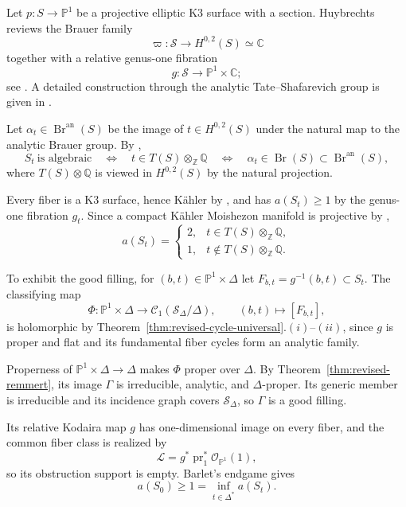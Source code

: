 \documentclass[11pt]{amsart}
\numberwithin{equation}{section}
\theoremstyle{plain}
\theoremstyle{definition}
\newcommand{\C}{\mathbb C}
\newcommand{\Z}{\mathbb Z}
\newcommand{\Q}{\mathbb Q}
\newcommand{\cC}{\mathcal C}
\newcommand{\cO}{\mathcal O}
\begin{document}
Let $p:S\to\mathbb P^1$ be a projective elliptic K3 surface with a section.
Huybrechts reviews the Brauer family
\begin{equation*}
 \varpi:\mathscr S\longrightarrow H^{0,2}(S)\simeq\C
\end{equation*}
together with a relative genus-one fibration
\begin{equation*}
 g:\mathscr S\longrightarrow\mathbb P^1\times\C;
\end{equation*}
see \cite[\S~1.2, equation~(1.1), and Remark~1.7]{Hu23}.  A detailed
construction through the analytic Tate--Shafarevich group is given in
\cite[Chapter~1.5]{FM94}.

Let $\alpha_t\in\operatorname{Br}^{\mathrm{an}}(S)$ be the image of
$t\in H^{0,2}(S)$ under the natural map to the analytic Brauer group.
By \cite[Corollary~3.3]{Hu23},
\[
 S_t\ \text{is algebraic}
 \quad\Longleftrightarrow\quad
 t\in T(S)\otimes_{\Z}\Q
 \quad\Longleftrightarrow\quad
 \alpha_t\in\operatorname{Br}(S)
 \subset\operatorname{Br}^{\mathrm{an}}(S),
\]
where $T(S)\otimes\Q$ is viewed in $H^{0,2}(S)$ by the natural projection.

Every fiber is a K3 surface, hence K\"ahler by \cite[Main Theorem]{Si83}, and has
$a(S_t)\ge1$ by the genus-one fibration $g_t$.  Since a compact K\"ahler
Moishezon manifold is projective by \cite{Mo67},
\begin{equation*}
 a(S_t)=
 \begin{cases}
 2,&t\in T(S)\otimes_{\Z}\Q,\\
 1,&t\notin T(S)\otimes_{\Z}\Q.
 \end{cases}
\end{equation*}

To exhibit the good filling, for $(b,t)\in\mathbb P^1\times\Delta$ let
$F_{b,t}=g^{-1}(b,t)\subset S_t$.  The classifying map
\[
 \Phi:\mathbb P^1\times\Delta\longrightarrow
 \cC_1(\mathscr S_\Delta/\Delta),
 \qquad(b,t)\longmapsto[F_{b,t}],
\]
is holomorphic by Theorem~\ref{thm:revised-cycle-universal}.$(i)$--$(ii)$,
since $g$ is proper and flat and its fundamental fiber cycles form an
analytic family.

Properness of $\mathbb P^1\times\Delta\to\Delta$ makes $\Phi$ proper over
$\Delta$.  By Theorem~\ref{thm:revised-remmert}, its image $\Gamma$ is
irreducible, analytic, and $\Delta$-proper.  Its generic member is
irreducible and its incidence graph covers $\mathscr S_\Delta$, so
$\Gamma$ is a good filling.

Its relative Kodaira map $g$ has one-dimensional image on every fiber,
and the common fiber class is realized by
\begin{equation*}
 \mathscr L=g^*\operatorname{pr}_1^*\cO_{\mathbb P^1}(1),
\end{equation*}
so its obstruction support is empty.  Barlet's endgame gives
\[
 a(S_0)\ge1=\inf_{t\in\Delta^*}a(S_t).
\]
\end{document}

